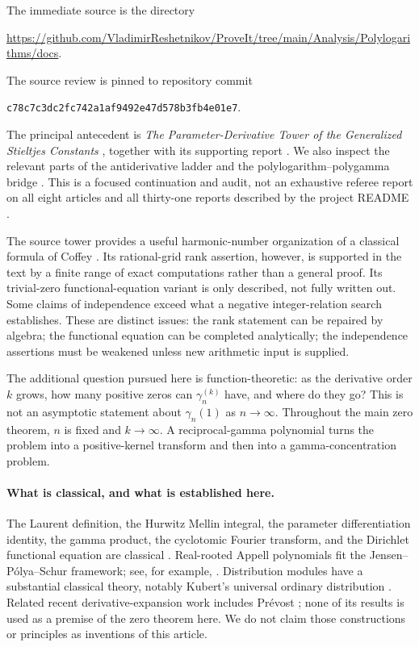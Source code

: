 \documentclass[11pt]{article}
\theoremstyle{definition}
\theoremstyle{remark}
\begin{document}
The immediate source is the directory
\begin{center}\small
\url{https://github.com/VladimirReshetnikov/ProveIt/tree/main/Analysis/Polylogarithms/docs}.
\end{center}
The source review is pinned to repository commit
\begin{center}\small\texttt{c78c7c3dc2fc742a1af9492e47d578b3fb4e01e7}.
\end{center}
The principal antecedent is \emph{The Parameter-Derivative Tower of the Generalized Stieltjes Constants} \cite{RepoTower}, together with its supporting report \cite{RepoReport}. We also inspect the relevant parts of the antiderivative ladder \cite{RepoAnti} and the polylogarithm--polygamma bridge \cite{RepoBridge}. This is a focused continuation and audit, not an exhaustive referee report on all eight articles and all thirty-one reports described by the project README \cite{RepoReadme}.

The source tower provides a useful harmonic-number organization of a classical formula of Coffey \cite[Corollary~2]{Coffey}. Its rational-grid rank assertion, however, is supported in the text by a finite range of exact computations rather than a general proof. Its trivial-zero functional-equation variant is only described, not fully written out. Some claims of independence exceed what a negative integer-relation search establishes. These are distinct issues: the rank statement can be repaired by algebra; the functional equation can be completed analytically; the independence assertions must be weakened unless new arithmetic input is supplied.

The additional question pursued here is function-theoretic: as the derivative order $k$ grows, how many positive zeros can $\gamma_n^{(k)}$ have, and where do they go? This is not an asymptotic statement about $\gamma_n(1)$ as $n\to\infty$. Throughout the main zero theorem, $n$ is fixed and $k\to\infty$. A reciprocal-gamma polynomial turns the problem into a positive-kernel transform and then into a gamma-concentration problem.

\paragraph{What is classical, and what is established here.}
The Laurent definition, the Hurwitz Mellin integral, the parameter differentiation identity, the gamma product, the cyclotomic Fourier transform, and the Dirichlet functional equation are classical \cite{Coffey,DLMFHurwitz,DLMFGamma,DLMFL}. Real-rooted Appell polynomials fit the Jensen--P\'olya--Schur framework; see, for example, \cite{Duran}. Distribution modules have a substantial classical theory, notably Kubert's universal ordinary distribution \cite{Kubert}. Related recent derivative-expansion work includes Pr\'evost \cite{Prevost}; none of its results is used as a premise of the zero theorem here. We do not claim those constructions or principles as inventions of this article.
\end{document}
